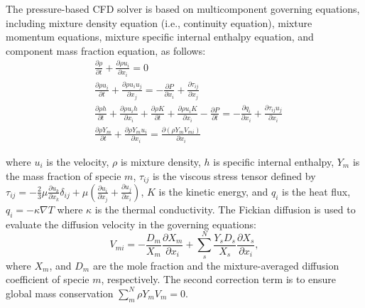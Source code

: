 The pressure-based CFD solver is based on multicomponent governing equations, including mixture density equation (i.e., continuity equation), mixture momentum equations, mixture specific internal enthalpy equation, and component mass fraction equation, as follows:
\begin{align}
	 & \frac{\partial \rho}{\partial t}+\frac{\partial \rho u_i}{\partial x_i}=0 \label{G:start}                                                                                                                                                                            \\
	 & \frac{\partial \rho u_i}{\partial t}+\frac{\partial \rho u_i u_j}{\partial x_j}=-\frac{\partial P}{\partial x_i}+\frac{\partial \tau_{ij}}{\partial x_j} \label{Gm}                                                                                                  \\
	 & \frac{\partial \rho h}{\partial t}+\frac{\partial \rho u_i h}{\partial x_i}+\frac{\partial \rho K}{\partial t}+\frac{\partial \rho u_i K}{\partial x_i}-\frac{\partial P}{\partial t}=-\frac{\partial q_i}{\partial x_i} +\frac{\partial \tau_{ij}u_j}{\partial x_i} \\
	 & \frac{\partial \rho Y_m}{\partial t}+\frac{\partial \rho Y_m u_i}{\partial x_i}=\frac{\partial\left(\rho Y_m V_{mi}\right)}{\partial x_i}  \label{G:end}
\end{align}

where $u_i$ is the velocity, $\rho$ is mixture density, $h$ is specific internal enthalpy, $Y_m$ is the mass fraction of specie $m$, $\tau_{ij}$ is the viscous stress tensor defined by $ \tau_{ij} = -\frac{2}{3}\mu\frac{\partial u_k}{\partial x_k}\delta_{ij} + \mu \left( \frac{\partial u_i}{\partial x_j} +\frac{\partial u_j}{\partial x_i}\right) $, $K$ is the kinetic energy, and $q_i$ is the heat flux, $q_i = -\kappa \nabla  T$ where $\kappa$ is the thermal conductivity.
The Fickian diffusion is used to evaluate the diffusion velocity in the governing equations:
$$ V_{mi} = -\frac{D_m}{X_m}\frac{\partial X_m} {\partial x_i} + \sum^{N}_{s}\frac{Y_s D_s}{X_s}\frac{\partial X_s} {\partial x_i},$$
where $X_m$, and $D_m$ are the mole fraction and the mixture-averaged diffusion coefficient of specie $m$, respectively. The second correction term is to ensure global mass conservation $\sum^{N}_{m} \rho Y_m V_m = 0$.


